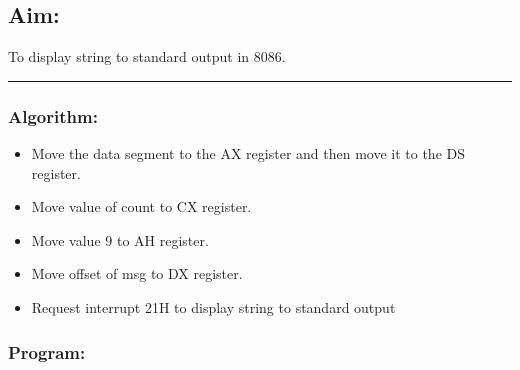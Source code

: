 \documentclass[12pt,a4paper]{article}
\begin{document}
\begin{flushleft}
\subsection*{\textbf{Aim:}} 
To display string to standard output in 8086.

\vspace{1cm}
\hrule

\subsubsection*{\textbf{Algorithm:}}
\begin{itemize}
    \item Move the data segment to the AX register and then move it to the DS register.
    \item Move value of count to CX register.
    \item Move value 9 to AH register.
    \item Move offset of msg to DX register.
    \item Request interrupt 21H to display string to standard output
\end{itemize}

\newpage
\subsubsection*{\textbf{Program:}}


\end{flushleft}
\end{document}
